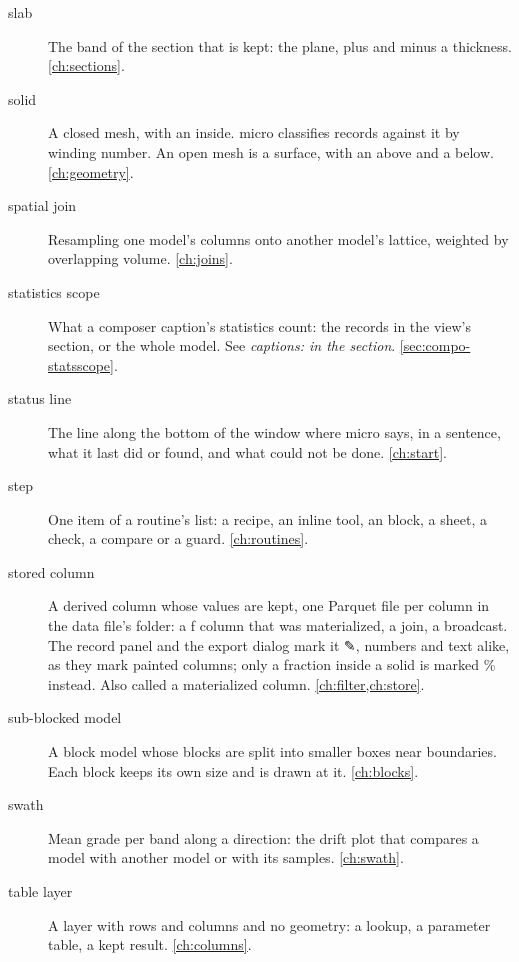 \begin{description}
\item[slab] The band of the section that is kept: the plane, plus and minus a thickness.
  \cref{ch:sections}.

\item[solid] A closed mesh, with an inside. micro classifies records against it by winding number.
  An open mesh is a surface, with an above and a below. \cref{ch:geometry}.

\item[spatial join] Resampling one model's columns onto another model's lattice, weighted by
  overlapping volume. \cref{ch:joins}.

\item[statistics scope] What a composer caption's statistics count: the records in the view's
  section, or the whole model. See \emph{captions: in the section}. \cref{sec:compo-statsscope}.

\item[status line] The line along the bottom of the window where micro says, in a sentence, what
  it last did or found, and what could not be done. \cref{ch:start}.

\item[step] One item of a routine's list: a recipe, an inline tool, an  block, a
   sheet, a check, a compare or a guard. \cref{ch:routines}.

\item[stored column] A derived column whose values are kept, one Parquet file per column in the
  data file's  folder: a ƒ column that was materialized, a join, a broadcast. The
  record panel and the export dialog mark it ✎, numbers and text alike, as they mark painted
  columns; only a fraction inside a solid is marked \% instead. Also called a materialized column. \cref{ch:filter,ch:store}.

\item[sub-blocked model] A block model whose blocks are split into smaller boxes near boundaries.
  Each block keeps its own size and is drawn at it. \cref{ch:blocks}.

\item[swath] Mean grade per band along a direction: the drift plot that compares a model with
  another model or with its samples. \cref{ch:swath}.

\item[table layer] A layer with rows and columns and no geometry: a lookup, a parameter table, a
  kept result. \cref{ch:columns}.


\end{description}
